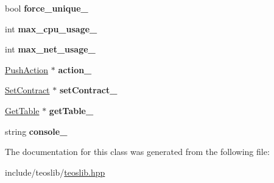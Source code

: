 \begin{DoxyCompactItemize}
bool {\bfseries force\+\_\+unique\+\_\+}
\item 
\mbox{\label{classteoslib_1_1_contract_ad6c29bfc78bc8b1e14cfdf058ac8bc02}} 
int {\bfseries max\+\_\+cpu\+\_\+usage\+\_\+}
\item 
\mbox{\label{classteoslib_1_1_contract_a6c2c7c485f12ca9acd8418034eb12bbd}} 
int {\bfseries max\+\_\+net\+\_\+usage\+\_\+}
\item 
\mbox{\label{classteoslib_1_1_contract_a9b7e6e9177cfd2546a4c522c358e6ed4}} 
\mbox{\hyperlink{classteos_1_1command_1_1_push_action}{Push\+Action}} $\ast$ {\bfseries action\+\_\+}
\item 
\mbox{\label{classteoslib_1_1_contract_a41862408b1f4dfad6cb32ba0c5cf166b}} 
\mbox{\hyperlink{classteos_1_1command_1_1_set_contract}{Set\+Contract}} $\ast$ {\bfseries set\+Contract\+\_\+}
\item 
\mbox{\label{classteoslib_1_1_contract_a1f5351d94cd3092f63b1e7165d510446}} 
\mbox{\hyperlink{classteos_1_1command_1_1_get_table}{Get\+Table}} $\ast$ {\bfseries get\+Table\+\_\+}
\item 
\mbox{\label{classteoslib_1_1_contract_a37390d9bff4c4a595010c052161524df}} 
string {\bfseries console\+\_\+}
\end{DoxyCompactItemize}


The documentation for this class was generated from the following file\+:\begin{DoxyCompactItemize}
\item 
include/teoslib/\mbox{\hyperlink{teoslib_8hpp}{teoslib.\+hpp}}\end{DoxyCompactItemize}
